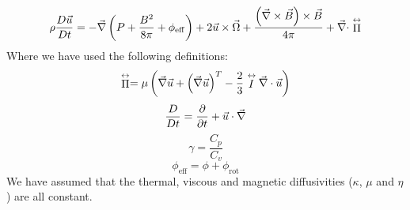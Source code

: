 \documentclass[apj,onecolumn]{emulateapj}
\newcommand{\uvec}{\ensuremath{\vec{u}}} %
\newcommand{\Bvec}{\ensuremath{\vec{B}}} %
\begin{document}
\begin{equation}
\rho\DxDt{\uvec} = -\del\left(P + \frac{B^2}{8\pi} + \phi_{\mathrm{eff}}\right) +
           2\uvec\times\vec{\Omega} +
           \frac{\left(\del\times\Bvec\right)\times\Bvec}{4\pi} +
           \del\cdot\stackrel{\leftrightarrow}{\Pi}
\end{equation}
Where we have used the following definitions:
\begin{equation}
\stackrel{\leftrightarrow}{\Pi} = \mu\left(\del\uvec +
       \left(\del\uvec\right)^T -
       \frac{2}{3}\stackrel{\leftrightarrow}{I}\del\cdot\uvec\right)
\end{equation}
\begin{equation}
\DDt = \ddt + \uvec\cdot\del
\end{equation}
\begin{equation}
\gamma = \frac{C_p}{C_v}
\end{equation}
\begin{equation}
\phi_{\mathrm{eff}} = \phi + \phi_{\mathrm{rot}}
\end{equation}
We have assumed that the thermal, viscous and magnetic diffusivities 
($\kappa$, $\mu$ and $\eta$) are all constant.


\end{document}
